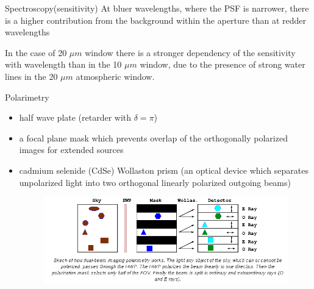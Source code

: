 \documentclass{beamer}
\begin{document}
\begin{frame}{Spectroscopy(sensitivity)}
At bluer wavelengths, where the PSF is narrower, there is a higher contribution from the background 
within the aperture than at redder wavelengths

In the case of 20 $\mu m$ window  there is a stronger dependency of the sensitivity with wavelength than in the 10 $\mu m$  window, 
due to the presence of strong water lines in the 20 $\mu m$ atmospheric window.
\end{frame}


\begin{frame}{Polarimetry}

\begin{itemize}
\item half wave plate (retarder with $\delta = \pi$)
\item  a focal plane mask which prevents overlap of the orthogonally polarized images for extended sources
\item cadmium selenide (CdSe) Wollaston prism (an optical device which separates  unpolarized light into two orthogonal 
linearly polarized outgoing beams)
\begin{figure}[H]
 \centering
 \includegraphics[scale=0.4]{img1.png}
\end{figure}
\end{itemize}

\end{frame}
\end{document}

